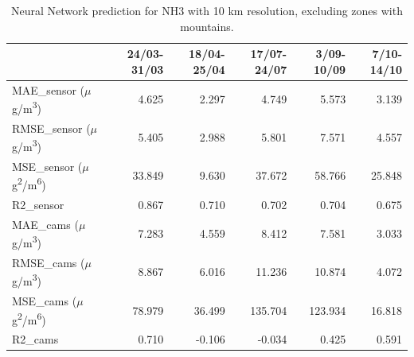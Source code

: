 \begin{table}[H]
\begin{tabular}{lrrrrr}
\toprule
 &  24/03-31/03 &  18/04-25/04 &  17/07-24/07 &  3/09-10/09 &  7/10-14/10 \\
\midrule
 MAE\_sensor ($\mu$g/m\textsuperscript{3})&        4.625 &        2.297 &        4.749 &       5.573 &       3.139 \\
RMSE\_sensor ($\mu$g/m\textsuperscript{3})&        5.405 &        2.988 &        5.801 &       7.571 &       4.557 \\
 MSE\_sensor ($\mu$g\textsuperscript{2}/m\textsuperscript{6})&       33.849 &        9.630 &       37.672 &      58.766 &      25.848 \\
  R2\_sensor &        0.867 &        0.710 &        0.702 &       0.704 &       0.675 \\
   MAE\_cams ($\mu$g/m\textsuperscript{3})&        7.283 &        4.559 &        8.412 &       7.581 &       3.033 \\
  RMSE\_cams ($\mu$g/m\textsuperscript{3})&        8.867 &        6.016 &       11.236 &      10.874 &       4.072 \\
   MSE\_cams ($\mu$g\textsuperscript{2}/m\textsuperscript{6})&       78.979 &       36.499 &      135.704 &     123.934 &      16.818 \\
    R2\_cams &        0.710 &       -0.106 &       -0.034 &       0.425 &       0.591 \\
\bottomrule
\end{tabular}
\caption{Neural Network prediction for NH3 with 10 km resolution, excluding zones with mountains.}
\end{table}

